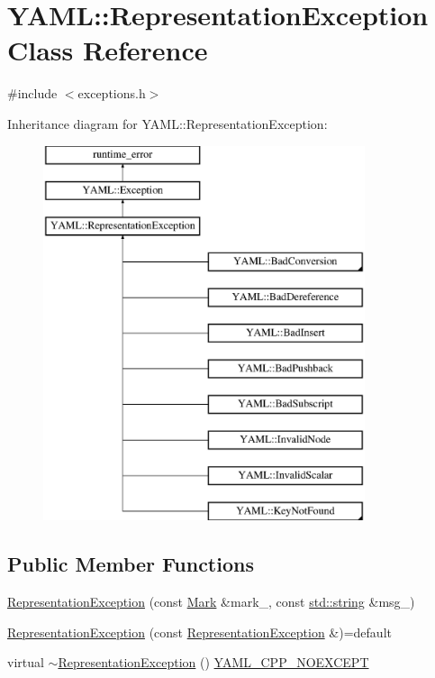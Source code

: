 \hypertarget{class_y_a_m_l_1_1_representation_exception}{}\section{Y\+A\+ML\+::Representation\+Exception Class Reference}
\label{class_y_a_m_l_1_1_representation_exception}


{\ttfamily \#include $<$exceptions.\+h$>$}

Inheritance diagram for Y\+A\+ML\+::Representation\+Exception\+:\begin{figure}[H]
\begin{center}
\leavevmode
\includegraphics[height=11.000000cm]{class_y_a_m_l_1_1_representation_exception}
\end{center}
\end{figure}
\subsection*{Public Member Functions}
\begin{DoxyCompactItemize}
\item 
\mbox{\hyperlink{class_y_a_m_l_1_1_representation_exception_a1c1f639078c8dcd9b59d4288b843abf9}{Representation\+Exception}} (const \mbox{\hyperlink{struct_y_a_m_l_1_1_mark}{Mark}} \&mark\+\_\+, const \mbox{\hyperlink{glad_8h_ac83513893df92266f79a515488701770}{std\+::string}} \&msg\+\_\+)
\item 
\mbox{\hyperlink{class_y_a_m_l_1_1_representation_exception_ac237c660089ff0d4d16b6ef5ba196f17}{Representation\+Exception}} (const \mbox{\hyperlink{class_y_a_m_l_1_1_representation_exception}{Representation\+Exception}} \&)=default
\item 
virtual \mbox{\hyperlink{class_y_a_m_l_1_1_representation_exception_a4dfd83460bca723f60f041e6948dca5e}{$\sim$\+Representation\+Exception}} () \mbox{\hyperlink{exceptions_8cpp_a4ea58eb0a28000364858d4942add7d1a}{Y\+A\+M\+L\+\_\+\+C\+P\+P\+\_\+\+N\+O\+E\+X\+C\+E\+PT}}
\end{DoxyCompactItemize}
